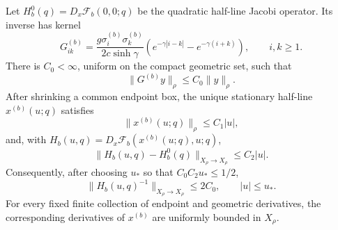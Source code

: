\begin{lemma}
\label{lem:v22-weighted-inverse}
Let $H_b^0(q)=D_x\mathscr F_b(0,0;q)$ be the quadratic half-line Jacobi
operator.  Its inverse has kernel
\begin{equation}\label{eq:v22-half-green}
 G^{(b)}_{ik}=\frac{g\sigma_i^{(b)}\sigma_k^{(b)}}
 {2c\sinh\gamma}
 \left(e^{-\gamma|i-k|}-e^{-\gamma(i+k)}\right),
 \qquad i,k\ge1.
\end{equation}
There is $C_0<\infty$, uniform on the compact geometric set, such that
\begin{equation}\label{eq:v22-green-weighted-bound}
                  \|G^{(b)}y\|_\rho\le C_0\|y\|_\rho.
\end{equation}
After shrinking a common endpoint box, the unique stationary half-line
$x^{(b)}(u;q)$ satisfies
\begin{equation}\label{eq:v22-orbit-weight}
                  \|x^{(b)}(u;q)\|_\rho\le C_1|u|,
\end{equation}
and, with
$H_b(u,q)=D_x\mathscr F_b(x^{(b)}(u;q),u;q)$,
\begin{equation}\label{eq:v22-hessian-perturbation}
 \|H_b(u,q)-H_b^0(q)\|_{X_\rho\to X_\rho}\le C_2|u|.
\end{equation}
Consequently, after choosing $u_*$ so that $C_0C_2u_*\le1/2$,
\begin{equation}\label{eq:v22-uniform-inverse}
          \|H_b(u,q)^{-1}\|_{X_\rho\to X_\rho}\le2C_0,
          \qquad |u|\le u_*.
\end{equation}
For every fixed finite collection of endpoint and geometric derivatives, the
corresponding derivatives of $x^{(b)}$ are uniformly bounded in $X_\rho$.
\end{lemma}

